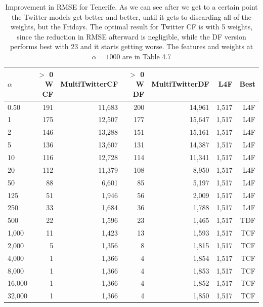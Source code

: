 \documentclass[minf,frontabs,twoside,singlespacing,parskip]{infthesis}
\begin{document}
\begin{table}[h]
\begin{center}
\begin{tabular}{ l | r | r | r | r | r | r}
$\alpha$ & $>$ 0 W CF & MultiTwitterCF & $>$ 0 W DF & MultiTwitterDF & L4F & Best\\
\hline
0.50 & 191 & 11,683 & 200 & 14,961 & 1,517 & L4F\\
1 & 175 & 12,507 & 177 & 15,647 & 1,517 & L4F\\
2 & 146 & 13,288 & 151 & 15,161 & 1,517 & L4F\\
5 & 136 & 13,607 & 131 & 14,387 & 1,517 & L4F\\
10 & 116 & 12,728 & 114 & 11,341 & 1,517 & L4F\\
20 & 112 & 11,379 & 108 & 8,950 & 1,517 & L4F\\
50 & 88 & 6,601 & 85 & 5,197 & 1,517 & L4F\\
125 & 51 & 1,946 & 56 & 2,009 & 1,517 & L4F\\
250 & 33 & 1,684 & 36 & 1,788 & 1,517 & L4F\\
\hline
500 & 22 & 1,596 & 23 & 1,465 & 1,517 & TDF\\
1,000 & 11 & 1,423 & 13 & 1,593 & 1,517 & TCF\\
2,000 & 5 & 1,356 & 8 & 1,815 & 1,517 & TCF\\
4,000 & 1 & 1,366 & 4 & 1,854 & 1,517 & TCF\\
8,000 & 1 & 1,366 & 4 & 1,853 & 1,517 & TCF\\
16,000 & 1 & 1,366 & 4 & 1,852 & 1,517 & TCF\\
32,000 & 1 & 1,366 & 4 & 1,850 & 1,517 & TCF\\
\end{tabular}
\end{center}
\caption{Improvement in RMSE for Tenerife. As we can see after we get to a certain point the Twitter models get better and better, until it gets to discarding all of the weights, but the Fridays. The optimal result for Twitter CF is with 5 weights, since the reduction in RMSE afterward is negligible, while the DF version performs best with 23 and it starts getting worse. The features and weights at $\alpha = 1000$ are in Table 4.7}
\label{table-tenerife}
\end{table}
\end{document}
